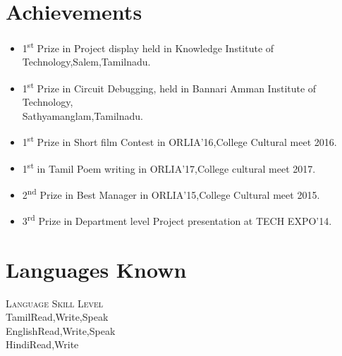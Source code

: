 \documentclass[a4paper,12pt,line]{article}
\begin{document}
	\section*{{\color{magenta}Achievements}}
	\begin{itemize}
		\item 1\textsuperscript{st} Prize in Project display held in Knowledge Institute of Technology,Salem,Tamilnadu.
		\item 1\textsuperscript{st} Prize in Circuit Debugging, held in Bannari Amman Institute of Technology,\\Sathyamanglam,Tamilnadu.
		\item 1\textsuperscript{st} Prize in Short film Contest in ORLIA’16,College Cultural meet 2016.
		\item 1\textsuperscript{st} in Tamil Poem writing in ORLIA'17,College cultural meet 2017.
		\item 2\textsuperscript{nd} Prize in Best Manager in ORLIA’15,College Cultural meet 2015.
		\item 3\textsuperscript{rd} Prize in Department level Project presentation at TECH EXPO’14.
	\end{itemize}


	\section*{{\color{magenta}Languages Known}}
	\centering
	\vspace{5pt}
	\color{blue}\textsc{Language} \hspace*{2cm}\color{blue}\textsc{Skill Level}\\
	\hspace*{0.7cm}\color{black}Tamil\hspace*{2.7cm}Read,Write,Speak\\
	\hspace*{0.7cm}English\hspace*{2.3cm}Read,Write,Speak\\
	\hspace*{-0.5cm}Hindi\hspace*{2.6cm}Read,Write\\
\end{document}
